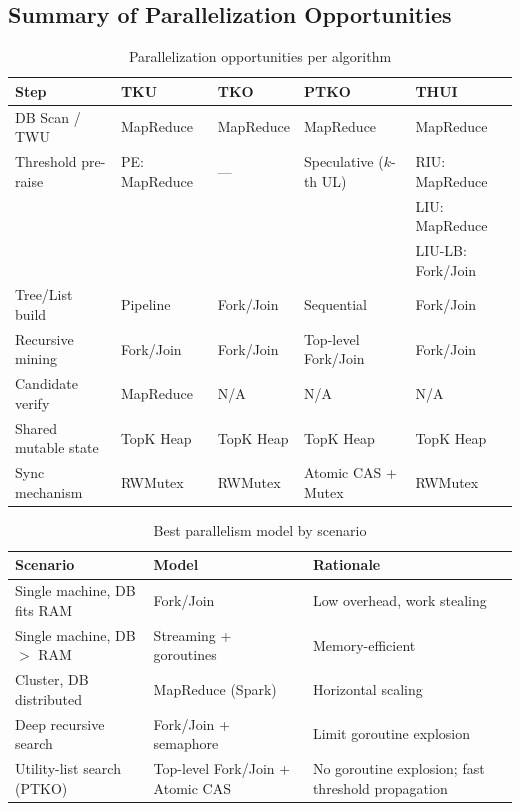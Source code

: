 \subsection{Summary of Parallelization Opportunities}

\begin{table}[H]
\caption{Parallelization opportunities per algorithm}\label{tab:par_summary}
\centering
\begin{tabular}{@{}lllll@{}}
\toprule
\textbf{Step} & \textbf{TKU} & \textbf{TKO} & \textbf{PTKO} & \textbf{THUI} \\
\midrule
DB Scan / TWU & MapReduce & MapReduce & MapReduce & MapReduce \\
Threshold pre-raise & PE: MapReduce & --- & Speculative ($k$-th UL) & RIU: MapReduce \\
 & & & & LIU: MapReduce \\
 & & & & LIU-LB: Fork/Join \\
Tree/List build & Pipeline & Fork/Join & Sequential & Fork/Join \\
Recursive mining & Fork/Join & Fork/Join & Top-level Fork/Join & Fork/Join \\
Candidate verify & MapReduce & N/A & N/A & N/A \\
Shared mutable state & TopK Heap & TopK Heap & TopK Heap & TopK Heap \\
Sync mechanism & RWMutex & RWMutex & Atomic CAS + Mutex & RWMutex \\
\bottomrule
\end{tabular}
\end{table}

\begin{table}[H]
\caption{Best parallelism model by scenario}\label{tab:model_choice}
\centering
\begin{tabular}{@{}lll@{}}
\toprule
\textbf{Scenario} & \textbf{Model} & \textbf{Rationale} \\
\midrule
Single machine, DB fits RAM & Fork/Join & Low overhead, work stealing \\
Single machine, DB $>$ RAM & Streaming + goroutines & Memory-efficient \\
Cluster, DB distributed & MapReduce (Spark) & Horizontal scaling \\
Deep recursive search & Fork/Join + semaphore & Limit goroutine explosion \\
Utility-list search (PTKO) & Top-level Fork/Join + Atomic CAS & No goroutine explosion; fast threshold propagation \\
\bottomrule
\end{tabular}
\end{table}